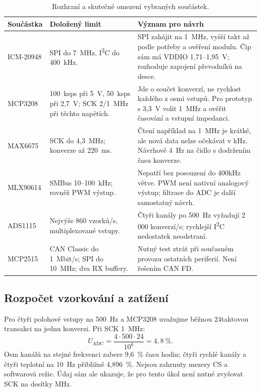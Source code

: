 \documentclass[11pt,a4paper]{article}
\begin{document}
\begin{table}[htbp]
\centering\small
\caption{Rozhraní a skutečné omezení vybraných součástek.}
\begin{tabularx}{\textwidth}{L{27mm}Y Y}
\toprule
Součástka & Doložený limit & Význam pro návrh\\
\midrule
ICM-20948 & SPI do 7~MHz, I\textsuperscript{2}C do 400~kHz.\cite{icm}
& SPI zahájit na 1~MHz, vyšší takt až podle potřeby a ověření modulu. Čip sám má VDDIO 1,71--1,95~V; rozhoduje zapojení převodníků na desce.\\
\addlinespace
MCP3208 & 100~ksps při 5~V, 50~ksps při 2,7~V; SCK 2/1~MHz při těchto napětích.\cite{mcp3208}
& Jde o součet konverzí, ne rychlost každého z osmi vstupů. Pro prototyp s 3,3~V volit 1~MHz a ověřit časování a vstupní impedanci.\\
\addlinespace
MAX6675 & SCK do 4,3~MHz; konverze až 220~ms.\cite{max6675}
& Čtení například na 1~MHz je krátké, ale nová data nelze očekávat v kHz. Návrhově 4~Hz na čidlo s dodržením času konverze.\\
\addlinespace
MLX90614 & SMBus 10--100~kHz; rovněž PWM výstup.\cite{mlx}
& Nepatří bez posouzení do 400kHz větve. PWM není nativní analogový výstup; filtrace do ADC je další samostatný návrh.\\
\addlinespace
ADS1115 & Nejvýše 860 vzorků/s, multiplexované vstupy.\cite{ads}
& Čtyři kanály po 500~Hz vyžadují 2\,000 konverzí/s; rychlejší I\textsuperscript{2}C nedostatek neodstraní.\\
\addlinespace
MCP2515 & CAN Classic do 1~Mbit/s; SPI do 10~MHz; dva RX buffery.\cite{mcp2515}
& Nutný test ztrát při současném provozu ostatních periferií. Není řešením CAN FD.\\
\bottomrule
\end{tabularx}
\end{table}

\subsection{Rozpočet vzorkování a zatížení}
Pro čtyři polohové vstupy na 500~Hz a MCP3208 uvažujme běžnou 24taktovou transakci na jednu konverzi. Při SCK 1~MHz:
\begin{equation}
U_{\mathrm{ADC}}=\frac{4\cdot500\cdot24}{10^6}=4{,}8~\%.
\end{equation}
Osm kanálů na stejné frekvenci zabere 9,6~\% času hodin; čtyři rychlé kanály a čtyři teplotní na 10~Hz přibližně 4,896~\%. Nejsou zahrnuty mezery CS a softwarová režie. Údaj sám ale ukazuje, že pro tento úkol není nutné zvyšovat SCK na desítky MHz.
\end{document}
